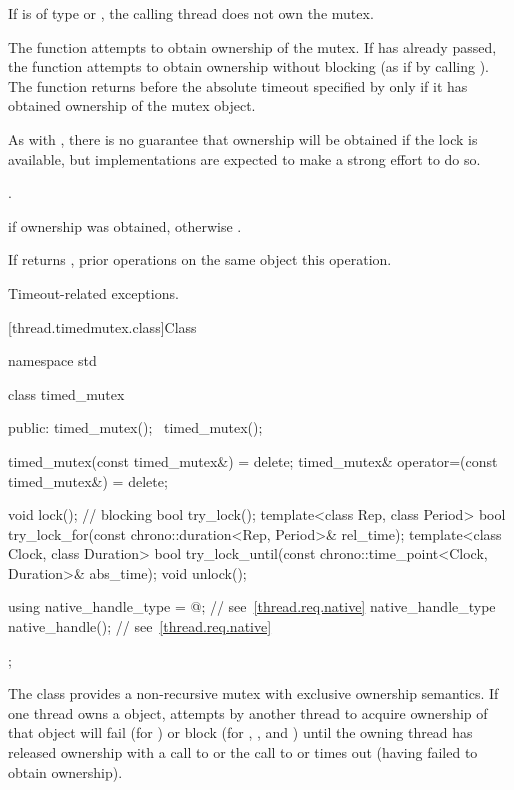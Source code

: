 \begin{itemdescr}
\pnum
\expects
If  is of type  or
, the calling thread does not own the
mutex.

\pnum
\effects
The function attempts to obtain ownership of the mutex. If
 has already passed, the function attempts to obtain ownership
without blocking (as if by calling ). The function
returns before the absolute timeout specified by
 only if it has obtained ownership of the mutex object.
\begin{note}
As with , there is no guarantee that ownership will
be obtained if the lock is available, but implementations are expected to make a
strong effort to do so.
\end{note}

\pnum
\returntype {}.

\pnum
\returns
{} if ownership was obtained, otherwise .

\pnum
\sync
If  returns , prior 
operations on the same object 
this operation.

\pnum
\throws
Timeout-related exceptions.
\end{itemdescr}

[thread.timedmutex.class]{Class }

%
\begin{codeblock}
namespace std {
  class timed_mutex {
  public:
    timed_mutex();
    ~timed_mutex();

    timed_mutex(const timed_mutex&) = delete;
    timed_mutex& operator=(const timed_mutex&) = delete;

    void lock();    // blocking
    bool try_lock();
    template<class Rep, class Period>
      bool try_lock_for(const chrono::duration<Rep, Period>& rel_time);
    template<class Clock, class Duration>
      bool try_lock_until(const chrono::time_point<Clock, Duration>& abs_time);
    void unlock();

    using native_handle_type = @\impdefnc@;          // see~\ref{thread.req.native}
    native_handle_type native_handle();                         // see~\ref{thread.req.native}
  };
}
\end{codeblock}

\pnum
{}%
The class  provides a non-recursive mutex with exclusive ownership
semantics. If one thread owns a  object, attempts by another thread
to acquire ownership of that object will fail (for ) or block
(for , , and ) until
the owning thread has released ownership with a call to  or the
call to  or  times out (having
failed to obtain ownership).

